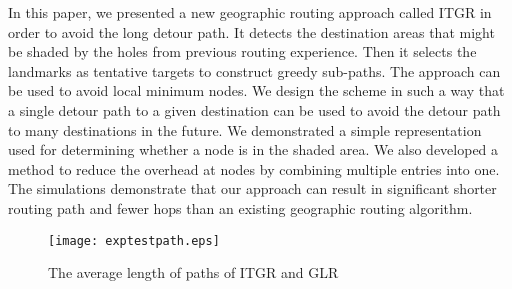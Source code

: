 \documentclass[3p,times]{elsarticle}
\begin{document}
In this paper, we presented a new geographic routing approach called ITGR
in order to avoid the long detour path. It detects the destination areas
that might be shaded by the holes from previous routing experience.
Then it selects the landmarks as tentative targets to construct greedy sub-paths.
The approach can be used to avoid local minimum nodes.
We design the scheme in such a way that
a single detour path to a given destination
can be used to avoid the detour path to many destinations in the future.
We demonstrated a simple representation used for determining whether a node is in
the shaded area. We also developed a method to reduce the
overhead at nodes by combining multiple entries into one.
The simulations demonstrate that our approach can result in significant shorter
routing path and fewer hops than an existing geographic routing algorithm.




\begin{figure}[!hb]
\begin{center}
\texttt{[image: exptestpath.eps]}
\end{center}
\caption{The average length of paths of ITGR and GLR}
\label{exptestpath}
\end{figure}
















~~~\\
~~~\\
\end{document}
